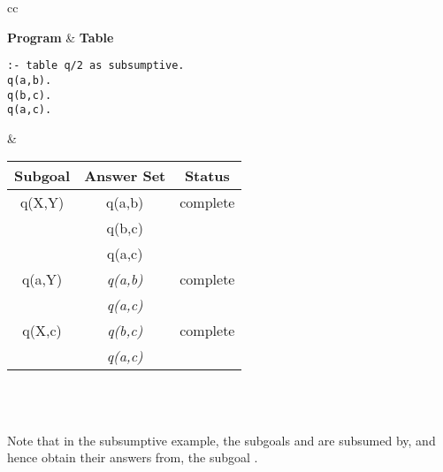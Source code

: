 \begin{center}
\begin{tabular}{cc}\hline \hline
{} \\ \hline \hline
\rule[-2ex]{0ex}{5ex} \textbf{Program} & \textbf{Table} \\
\begin{minipage}{17em}
\begin{verbatim}
:- table q/2 as subsumptive.
q(a,b).
q(b,c).
q(a,c).
\end{verbatim}
\end{minipage}
&
\begin{tabular}{|c|c|c|} \hline
  Subgoal & Answer Set & Status \\ \hline \hline
  q(X,Y) & q(a,b) & complete \\
         & q(b,c) & \\
         & q(a,c) & \\ \hline
  q(a,Y) & \textit{q(a,b)} & complete \\
         & \textit{q(a,c)} & \\ \hline
  q(X,c) & \textit{q(b,c)} & complete \\
         & \textit{q(a,c)} & \\ \hline
\end{tabular} \\
\vspace*{-2ex} \\ \hline \hline
\end{tabular}
\end{center}

\noindent
Note that in the subsumptive example, the subgoals  and
 are subsumed by, and hence obtain their answers from,
the subgoal \@.

\vspace{2ex}


